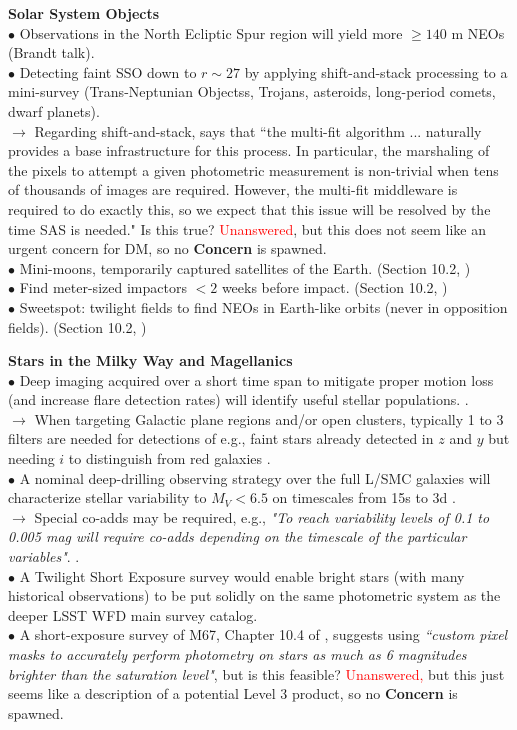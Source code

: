 \documentclass[DM,lsstdraft,toc]{lsstdoc}
\begin{document}
\medskip
\noindent \textbf{Solar System Objects}\\
$\bullet$ Observations in the North Ecliptic Spur region will yield more $\geq140$ m NEOs (Brandt talk). \\
$\bullet$ Detecting faint SSO down to $r\sim27$ by applying shift-and-stack processing to a mini-survey (Trans-Neptunian Objectss, Trojans, asteroids, long-period comets, dwarf planets). \citep{BeckerWP} \\
$\rightarrow$ Regarding shift-and-stack, \cite{BeckerWP} says that ``the multi-fit algorithm ... naturally provides a base infrastructure for this process. In particular, the marshaling of the pixels to attempt a given photometric measurement is non-trivial when tens of thousands of images are required. However, the multi-fit middleware is required to do exactly this, so we expect that this issue will be resolved by the time SAS is needed." Is this true? \textcolor{red}{Unanswered}, but this does not seem like an urgent concern for DM, so no \textbf{Concern} is spawned. \\
$\bullet$ Mini-moons, temporarily captured satellites of the Earth. (Section 10.2, \cite{OSWP}) \\
$\bullet$ Find meter-sized impactors $<2$ weeks before impact.  (Section 10.2, \cite{OSWP}) \\
$\bullet$ Sweetspot: twilight fields to find NEOs in Earth-like orbits (never in opposition fields). (Section 10.2, \cite{OSWP}) 

\noindent \textbf{Stars in the Milky Way and Magellanics} \\
$\bullet$ Deep imaging acquired over a short time span to mitigate proper motion loss (and increase flare detection rates) will identify useful stellar populations. \citep{DhitalWP}. \\
$\rightarrow$ When targeting Galactic plane regions and/or open clusters, typically 1 to 3 filters are needed for detections of e.g., faint stars already detected in $z$ and $y$ but needing $i$ to distinguish from red galaxies \cite{DhitalWP}. \\
$\bullet$ A nominal deep-drilling observing strategy over the full L/SMC galaxies will characterize stellar variability to $M_V<6.5$ on timescales from 15s to 3d \cite{SzkodyWP}. \\
$\rightarrow$ Special co-adds may be required, e.g., {\it "To reach variability levels of 0.1 to 0.005 mag will require co-adds depending on the timescale of the particular variables"}. \citep{SzkodyWP}. \\
$\bullet$ A Twilight Short Exposure survey would enable bright stars (with many historical observations) to be put solidly on the same photometric system as the deeper LSST WFD main survey catalog. \\
$\bullet$ A short-exposure survey of M67, Chapter 10.4 of \cite{OSWP}, suggests using {\it ``custom pixel masks to accurately perform photometry on stars as much as 6 magnitudes brighter than the saturation level"}, but is this feasible? \textcolor{red}{Unanswered,} but this just seems like a description of a potential Level 3 product, so no \textbf{Concern} is spawned.
\end{document}
